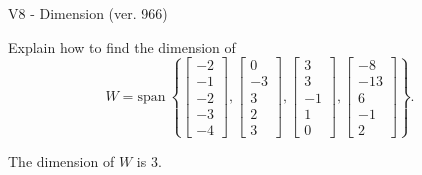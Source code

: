 \begin{exercise}
  \begin{exerciseTitle}V8 - Dimension (ver. 966)\end{exerciseTitle}
  \begin{exerciseStatement}
    Explain how to find the dimension of 
\[W=\mathrm{span}\ \left\{\left[\begin{array}{r}
-2 \\
-1 \\
-2 \\
-3 \\
-4
\end{array}\right] , \left[\begin{array}{r}
0 \\
-3 \\
3 \\
2 \\
3
\end{array}\right] , \left[\begin{array}{r}
3 \\
3 \\
-1 \\
1 \\
0
\end{array}\right] , \left[\begin{array}{r}
-8 \\
-13 \\
6 \\
-1 \\
2
\end{array}\right]\right\}.\]



  \end{exerciseStatement}
  \begin{exerciseAnswer}
   The dimension of \(W\) is  \(3\).
  


  \end{exerciseAnswer}
\end{exercise}